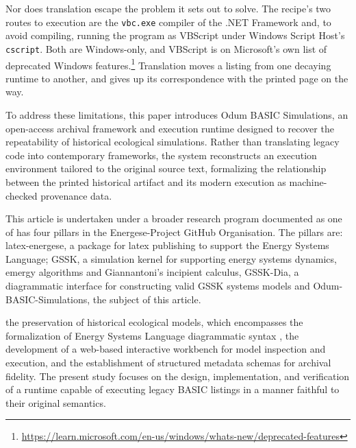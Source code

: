 \documentclass[3p,times,authoryear,twocolumn]{elsarticle}
\begin{document}
Nor does translation escape the problem it sets out to solve. The recipe's two routes to execution are the \texttt{vbc.exe} compiler of the .NET Framework and, to avoid compiling, running the program as VBScript under Windows Script Host's \texttt{cscript}. Both are Windows-only, and VBScript is on Microsoft's own list of deprecated Windows features.\footnote{\url{https://learn.microsoft.com/en-us/windows/whats-new/deprecated-features}} Translation moves a listing from one decaying runtime to another, and gives up its correspondence with the printed page on the way.

To address these limitations, this paper introduces Odum BASIC Simulations, an open-access archival framework and execution runtime designed to recover the repeatability of historical ecological simulations. Rather than translating legacy code into contemporary frameworks, the system reconstructs an execution environment tailored to the original source text, formalizing the relationship between the printed historical artifact and its modern execution as machine-checked provenance data. 

This article is undertaken under a broader research program documented as one of has four pillars in the Energese-Project GitHub Organisation. The pillars are: latex-energese, a package for latex publishing to support the Energy Systems Language; GSSK, a simulation kernel for supporting energy systems dynamics, emergy algorithms and Giannantoni's incipient calculus, GSSK-Dia, a diagrammatic interface for constructing valid GSSK systems models and Odum-BASIC-Simulations, the subject of this article.

the preservation of historical ecological models, which encompasses the formalization of Energy Systems Language diagrammatic syntax \citep{energese}, the development of a web-based interactive workbench for model inspection and execution, and the establishment of structured metadata schemas for archival fidelity. The present study focuses on the design, implementation, and verification of a runtime capable of executing legacy BASIC listings in a manner faithful to their original semantics. 
\end{document}
